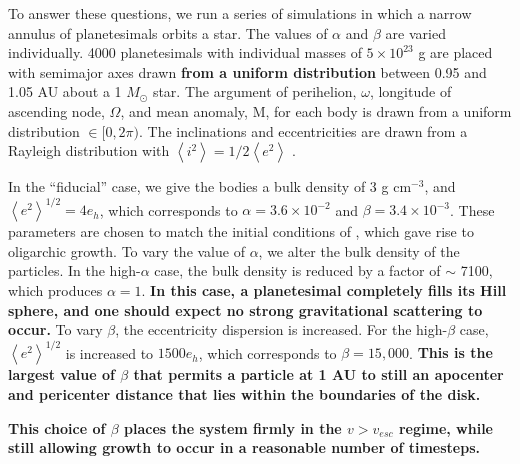\documentclass[twocolumn,linenumbers]{aastex63}
\begin{document}
To answer these questions, we run a series of simulations in which a
narrow annulus of planetesimals orbits a star. The values of $\alpha$
and $\beta$ are varied individually. 4000 planetesimals with
individual masses of $5 \times 10^{23}$ g are placed with semimajor
axes drawn \textbf{from a uniform distribution} between 0.95 and 1.05 AU about a 1 $M_{\odot}$
star. The argument of perihelion, $\omega$, longitude of ascending node,
$\Omega$, and mean anomaly, M, for each body is drawn from a uniform
distribution $\in [0, 2 \pi)$. The inclinations and eccentricities are drawn
from a Rayleigh distribution with
$\left< i^{2} \right> = 1/2 \left< e^{2} \right>$ \citep{ida93a}.

In the ``fiducial'' case, we give the bodies a bulk density of 3 g
cm$^{-3}$, and $\left< e^{2} \right>^{1/2} = 4 e_{h}$, which corresponds to $\alpha = 3.6 \times 10^{-2}$ and $\beta = 3.4 \times 
10^{-3}$. These parameters are chosen to match the initial conditions of \citet{kokubo98}, which gave rise to oligarchic growth. 
To vary the value of $\alpha$, we alter the bulk density of the particles. In the high-$\alpha$ case, the bulk density is reduced by 
a factor of $\sim$ 7100, which produces $\alpha = 1$. \textbf{In this case, a planetesimal completely fills its Hill sphere, and one should expect no strong gravitational scattering to occur.} To vary $\beta$, the eccentricity dispersion is increased. For the high-$
\beta$ case, $\left< e^{2} \right>^{1/2}$ is increased to $1500 e_{h}$, which corresponds to $\beta = 15,000$. \textbf{This is the largest value of $\beta$ that permits a particle at 1 AU to still an apocenter and pericenter distance that lies within the boundaries of the disk.}

\textbf{This choice of $\beta$ places the system firmly in the $v > v_{esc}$ regime, while still allowing growth to occur in a reasonable number of timesteps.}
\end{document}
